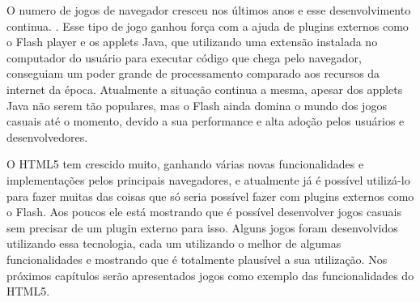 O numero de jogos de navegador cresceu nos últimos anos e esse
desenvolvimento continua. \cite{ozcan2010recent}. Esse tipo de jogo
ganhou força com a ajuda de plugins externos como o Flash player e
os applets Java, que utilizando uma extensão instalada no computador
do usuário para executar código que chega pelo navegador,
conseguiam um poder grande de processamento comparado aos
recursos da internet da época.
Atualmente a situação continua a mesma, apesar dos applets Java não
serem tão populares, mas o Flash ainda domina o mundo dos jogos
casuais até o momento, devido a sua performance e alta adoção pelos
usuários e desenvolvedores.

O HTML5 tem crescido muito, ganhando várias novas funcionalidades e
implementações pelos principais navegadores, e atualmente já é possível utilizá-lo
para fazer muitas das coisas que só seria possível fazer com plugins
externos como o Flash. Aos poucos ele está mostrando que é possível
desenvolver jogos casuais sem precisar de um plugin externo para isso.
Alguns jogos foram desenvolvidos utilizando essa tecnologia, cada um
utilizando o melhor de algumas funcionalidades e mostrando que é
totalmente plausível a sua utilização. Nos próximos capítulos serão
apresentados jogos como exemplo das funcionalidades do HTML5.
